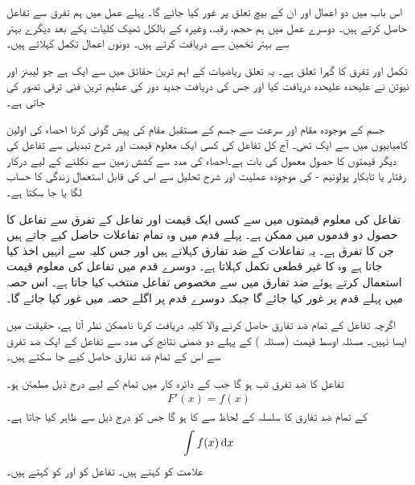 اس باب میں دو اعمال اور ان کے   بیچ تعلق پر غور کیا جائے گا۔ پہلے عمل میں  ہم تفرق سے تفاعل  حاصل کرتے ہیں۔ دوسرے عمل میں ہم حجم، رقبہ، وغیرہ کے بالکل ٹھیک  کلیات    یکے بعد دیگرے بہتر سے بہتر تخمین سے دریافت کرتے ہیں۔ دونوں اعمال تکمل کہلاتے  ہیں۔

تکمل اور تفرق کا گہرا تعلق ہے۔ یہ تعلق  ریاضیات کے  اہم ترین حقائق میں سے ایک ہے  جو  لیبنز اور نیوٹن نے علیحدہ علیحدہ     دریافت کیا  اور جس کی دریافت جدید دور  کی عظیم  ترین فنی ترقی تصور کی جاتی ہے۔

 جسم کے موجودہ مقام اور سرعت سے  جسم  کے مستقبل    مقام کی پیش گوئی کرنا احصاء کی اولین کامیابیوں میں سے ایک تھی۔ آج کل تفاعل کی کسی  ایک معلوم قیمت اور شرح تبدیلی سے تفاعل کی  دیگر قیمتوں کا حصول معمول کی بات ہے۔احصاء کی مدد سے  کشش زمین سے نکلنے کے لیے درکار رفتار یا تابکار  پولونیم ‑  کی موجودہ عملیت اور شرح  تحلیل سے اس کی  قابل استعمال زندگی کا حساب لگا  یا جا سکتا ہے۔

تفاعل کی معلوم قیمتوں میں سے کسی ایک قیمت اور تفاعل کے تفرق  سے تفاعل کا حصول دو قدموں میں ممکن ہے۔ پہلے قدم میں وہ تمام تفاعلات حاصل کیے جاتے ہیں جن کا تفرق  ہے۔ یہ تفاعلات   کے ضد تفارق کہلاتے ہیں اور جس کلیہ سے انہیں اخذ کیا جاتا ہے  وہ  کا غیر قطعی  تکمل  کہلاتا ہے۔ دوسرے قدم میں تفاعل کی معلوم قیمت استعمال کرتے ہوئے ضد تفارق میں سے مخصوص تفاعل منتخب کیا جاتا ہے۔ اس حصہ میں پہلے قدم پر غور کیا جائے گا جبکہ دوسرے قدم پر اگلے حصہ میں غور کیا جائے گا۔

اگرچہ تفاعل کے تمام ضد تفارق حاصل کرنے والا کلیہ دریافت کرنا  ناممکن نظر آتا ہے، حقیقت میں ایسا نہیں۔ مسئلہ اوسط قیمت (مسئلہ ) کے  پہلے    دو ضمنی نتائج کی مدد سے تفاعل کے  ایک ضد تفرق سے اس کے تمام ضد تفارق حاصل کیے جا سکتے ہیں۔ 

تفاعل  کا  ضد تفرق تب  ہو گا جب  کے دائرہ کار میں تمام  کے لیے درج ذیل مطمئن ہو۔
\begin{align*}
F'(x)=f(x)
\end{align*}
 کے تمام ضد تفارق کا سلسلہ  کے لحاظ سے  کا  ہو گا جس کو درج ذیل سے ظاہر کیا جاتا ہے۔
\begin{align*}
\int f(x)\dif x
\end{align*}
علامت  کو  کہتے ہیں۔ تفاعل  کو  اور  کو  کہتے ہیں۔

